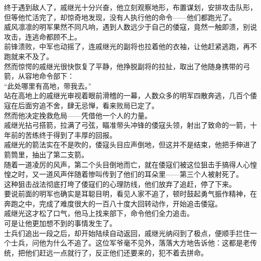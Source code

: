 \begin{multicols}{\theparacolNo}
终于遇到敌人了，戚继光十分兴奋，他立刻观察地形，布置谋划，安排攻击队形，但等他忙活完了，却惊奇地发现，没有人执行他的命令——他们都跑光了。\\

威风凛凛的明军果然不同凡响，遇到人数远少于自己的倭寇，竟然一触即溃，别说攻击，连逃命都顾不上。\\

前锋溃败，中军也动摇了，连戚继光的副将也拉着他的衣袖，让他赶紧逃跑，再不跑就来不及了。\\

然而惊愕的戚继光很快恢复了平静，他挣脱副将的拉扯，取出了他随身携带的弓箭，从容地命令部下：\\

“此处哪里有高地，带我去。”\\

站在高地上的戚继光审视着眼前滑稽的一幕，人数众多的明军四散奔逃，几百个倭寇在后面穷追不舍，肆无忌惮，看来败局已定了。\\

然而他决定挽救危局——凭借他一个人的力量。\\

戚继光拈弓搭箭，拉满了弓弦，瞄准带头冲锋的倭寇头领，射出了致命的一箭，十年前的苦练终于得到了丰厚的回报。\\

戚继光的箭法实在不是吹的，倭寇头目应声倒地，但这并不是结束，他把手伸进了箭筒里，抽出了第二支箭。\\

随着一道凌厉的风声，第二个头目倒地而亡，就在倭寇们被这位狙击手搞得人心惶惶之时，又一道风声伴随着惨叫传到了他们的耳朵里——第三个人被射死了。\\

这种狙击战法彻底打垮了倭寇们的心理防线，他们放弃了追赶，停了下来。\\

要说前面的明军也确实是耳聪目明，看见人家不追了，顿时鼓起勇气振作精神，在奔跑之中，完成了难度很大的一百八十度大回转动作，开始追击倭寇。\\

戚继光这才松了口气，他马上找来部下，命令他们全力追击。\\

可是让他更加想不到的事情发生了。\\

士兵们追出一段之后，却开始陆续自动返回，戚继光纳闷到了极点，便顺手拦住一个士兵，问他为什么不追了。这位军爷毫不见外，落落大方地告诉他：这都是老传统，把他们赶远一点就行了，反正他们还要来的，犯不着去拼命。\\


\end{multicols}
